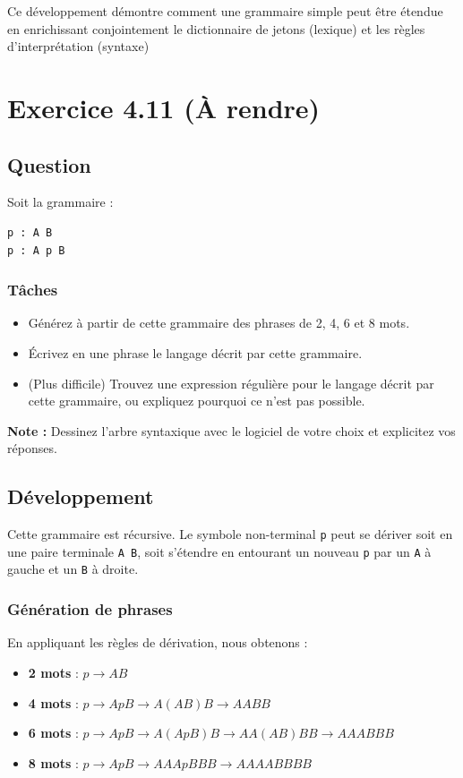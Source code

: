 Ce développement démontre comment une grammaire simple peut être étendue en enrichissant conjointement le dictionnaire de jetons (lexique) et les règles d'interprétation (syntaxe)


\section{Exercice 4.11 (À rendre)}
\subsection{Question}
Soit la grammaire :

\begin{verbatim}
p : A B
p : A p B
\end{verbatim}

\subsubsection*{Tâches}
\begin{itemize}
    \item Générez à partir de cette grammaire des phrases de 2, 4, 6 et 8 mots.
    \item Écrivez en une phrase le langage décrit par cette grammaire.
    \item (Plus difficile) Trouvez une expression régulière pour le langage décrit par cette grammaire, ou expliquez pourquoi ce n’est pas possible.
\end{itemize}

\textbf{Note :} Dessinez l’arbre syntaxique avec le logiciel de votre choix et explicitez vos réponses.

\subsection{Développement}
Cette grammaire est récursive. Le symbole non-terminal \texttt{p} peut se dériver soit en une paire terminale \texttt{A B}, soit s'étendre en entourant un nouveau \texttt{p} par un \texttt{A} à gauche et un \texttt{B} à droite.

\subsubsection*{Génération de phrases}
En appliquant les règles de dérivation, nous obtenons :
\begin{itemize}
    \item \textbf{2 mots} : $p \rightarrow A B$
    \item \textbf{4 mots} : $p \rightarrow A p B \rightarrow A (A B) B \rightarrow A A B B$
    \item \textbf{6 mots} : $p \rightarrow A p B \rightarrow A (A p B) B \rightarrow A A (A B) B B \rightarrow A A A B B B$
    \item \textbf{8 mots} : $p \rightarrow A p B \rightarrow A A A p B B B \rightarrow A A A A B B B B$
\end{itemize}

